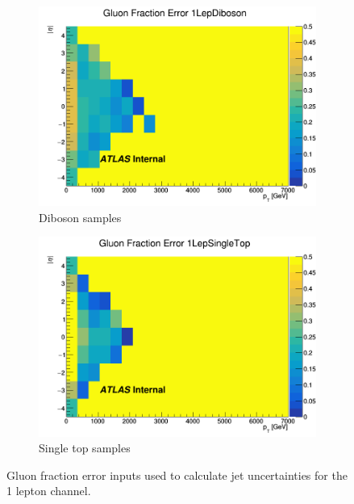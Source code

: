 \begin{figure}[p]
    \begin{subfigure}[b]{0.3\textwidth}
        \centering
        \includegraphics[width=\textwidth]{figures/QGfrac/GluonFracError2D_1LepDiboson.png}
        \caption{Diboson samples}
        \label{fig:GluonFracErrorDiboson}
    \end{subfigure}
    \begin{subfigure}[b]{0.3\textwidth}
        \centering
        \includegraphics[width=\textwidth]{figures/QGfrac/GluonFracError2D_1LepSingleTop.png}
        \caption{Single top samples}
        \label{fig:GluonFracErrorSingleTop}
    \end{subfigure}
    \hfill

    \caption{Gluon fraction error inputs used to calculate jet uncertainties for the 1 lepton channel.}
    \label{fig:QGFracErrorInputs2D1Lep}
\end{figure}


